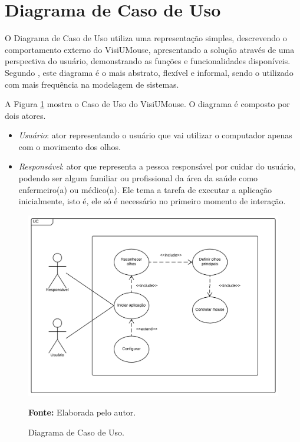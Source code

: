 \section{Diagrama de Caso de Uso}
O Diagrama de Caso de Uso utiliza uma representação simples, descrevendo o comportamento externo do VisiUMouse, apresentando a solução através de uma perspectiva do usuário, demonstrando as funções e funcionalidades disponíveis. Segundo , este diagrama é o mais abstrato, flexível e informal, sendo o utilizado com mais frequência na modelagem de sistemas.%

A Figura \ref{fig:use-case-diagram} mostra o Caso de Uso do VisiUMouse. O diagrama é composto por dois atores. 
\begin{itemize}
\item \textit{Usuário}: ator representando o usuário que vai utilizar o computador apenas com o movimento dos olhos. %

\item  \textit{Responsável}: ator que representa a pessoa responsável por cuidar do usuário, podendo ser algum familiar ou profissional da área da saúde como enfermeiro(a) ou médico(a). Ele tema a tarefa de executar a aplicação inicialmente, isto é, ele só é necessário no primeiro momento de interação. 

\end{itemize}


\begin{figure}[H]
\caption{Diagrama de Caso de Uso.}
\centering \includegraphics[scale=.5]{img/UseCase_Diagram_2.png}

{\fontsize{11}{11}\selectfont \textbf{Fonte:} Elaborada pelo autor.}
\label{fig:use-case-diagram}
\end{figure}

